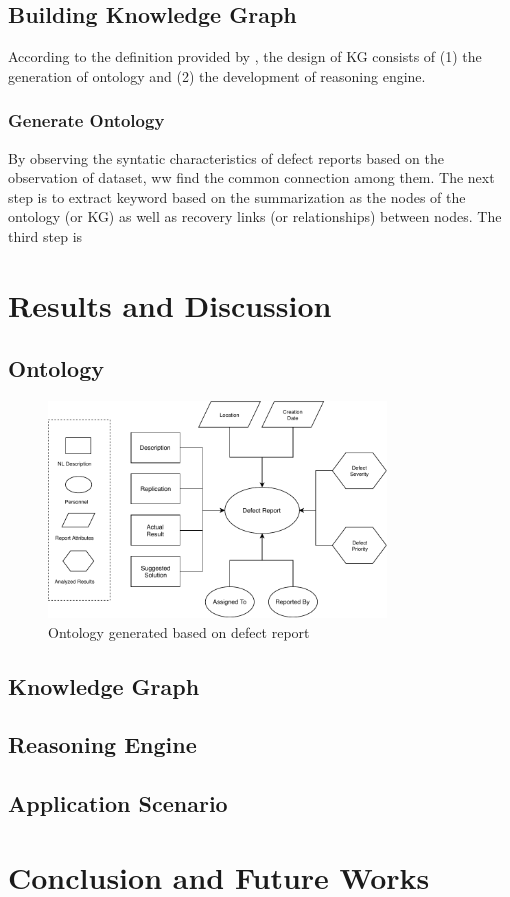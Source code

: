 \documentclass[12pt] {article}
\begin{document}
\subsection{Building Knowledge Graph}
According to the definition provided by , the design of KG consists of (1) the generation of ontology and (2) the development of reasoning engine.
\subsubsection{Generate Ontology}

By observing the syntatic characteristics of defect reports based on the observation of dataset, ww find the common connection among them.  
The next step is to extract keyword based on the summarization as the nodes of the ontology (or KG) as well as recovery links (or relationships) between nodes.
The third step is 

\section{Results and Discussion}
\subsection{Ontology}
\begin{figure}[h]
    \centering
    \includegraphics[width=0.8\textwidth]{../figures/OntologyOfDefectReport.pdf}
    \caption{Ontology generated based on defect report}
    \label{fig:defectreport}
\end{figure}
\subsection{Knowledge Graph}
\subsection{Reasoning Engine}
\subsection{Application Scenario}

\section{Conclusion and Future Works}


\pagebreak
\end{document}
